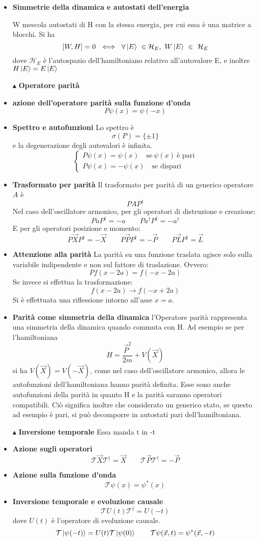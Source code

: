 \documentclass{book}
\newcommand{\g}{\textbf}
\newcommand{\e}{\begin{equation}}
\newcommand{\ex}{\end{equation} }
\renewcommand{\it}{\item[$\cdot$]}
\begin{document}
\begin{multicols}{4}
\begin{itemize}
\it \g{Simmetrie della dinamica e autostati dell'energia}

W mescola autostati di H con la stessa energia, per cui essa è una matrice a blocchi. Si ha 
\e{[W, H] = 0 \ \iff \ \forall \ket{E} \ \in \mathcal{H}_{E},\  W \ket{E} \ \in \ \mathcal{H}_{E}}\ex
dove $\mathcal{H}_{E}$ è l'autospazio dell'hamiltoniano relativo all'autovalore E, e inoltre $H\ket{E} = E\ket{E}$

    
\item [$\blacktriangle$] \g{Operatore parità}
    \it \g{azione dell’operatore parità sulla funzione d'onda}
        \e{P\psi(x) = \psi(-x)} \ex
    \it \g{Spettro e autofunzioni}
        Lo spettro è
        \e{\sigma(P) = \{\pm 1\}} \ex
        e la degenerazione degli autovalori è infinita. 
        \e{\begin{cases}
          P\psi(x) = \psi(x) \quad   \text{se} \ \psi(x) \ \text{è pari}\\
          P\psi(x) = -\psi(x) \quad \text{se dispari}
        \end{cases}}\ex

    \it \g{Trasformato per parità}
        Il trasformato per parità di un generico operatore $A$ è
        \e{PAP^\dagger} \ex
        Nel caso dell’oscillatore armonico, per gli operatori di distruzione e creazione:
        \e{PaP^\dagger = -a \qquad
        Pa^\dagger P^\dagger = -a^\dagger} \ex
        E per gli operatori posizione e momento:
        \e{P\vec{X}P^\dagger = -\vec{X} \qquad P\vec{P}P^\dagger = -\vec{P} \qquad P\vec{L}P^{\dagger} = \vec{L}} \ex
\it \g{Attenzione alla parità}
    La parità su una funzione traslata agisce solo sulla variabile indipendente e non sul fattore di traslazione. Ovvero:
        \e{Pf(x - 2a) = f(-x - 2a)} \ex
    Se invece si effettua la trasformazione:
        \e{f(x - 2a) \to f(-x + 2a)} \ex
    Si è effettuata una riflessione intorno all’asse $x = a$.
    \it \g{Parità come simmetria della dinamica}
    l'Operatore parità rappresenta una simmetria della dinamica quando commuta con H. Ad esempio se per l'hamiltoniana 
    \e{H = \frac{\vec{P}^{2}}{2m} + V(\vec{X})}\ex 
    si ha $V(\vec{X}) = V(-\vec{X})$, come nel caso dell'oscillatore armonico, allora le autofunzioni dell'hamiltoniana hanno parità definita. Esse sono anche autofunzioni della parità in quanto H e la parità saranno operatori compatibili. Ciò significa inoltre che considerato un generico stato, se questo ad esempio è pari, si può decomporre in autostati pari dell'hamiltoniana.
\item [$\blacktriangle$] \g{Inversione temporale}
Essa manda t in -t
\it \g{Azione sugli operatori}
\e{\mathcal{T}\vec{X} \mathcal{T}^{\dagger} = \vec{X} \qquad \mathcal{T} \vec{P} \mathcal{T}^{\dagger} = - \vec{P}}\ex
\it \g{Azione sulla funzione d'onda}
\e{\mathcal{T}\psi(x) = \psi^{*}(x)}\ex
\it \g{Inversione temporale e evoluzione causale}
\e{\mathcal{T}U(t)\mathcal{T}^{\dagger} = U(-t)}\ex 
dove $U(t)$ è l'operatore di evoluzione causale.
\e{\mathcal{T}\ket{\psi(-t)} = U(t)\mathcal{T}\ket{\psi(0)} \qquad \mathcal{T}\psi(\vec{x},t) = \psi^{*}(\vec{x},-t)}\ex
    

\end{itemize}
\end{multicols}
\end{document}
